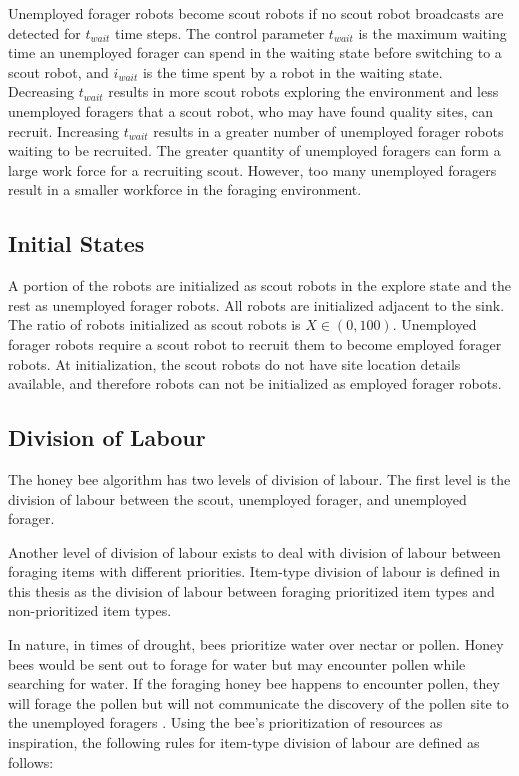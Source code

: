 Unemployed forager robots become scout robots if no scout robot broadcasts are detected for $t_{wait}$ time steps. The control parameter $t_{wait}$ is the maximum waiting time an unemployed forager can spend in the waiting state before switching to a scout robot, and $i_{wait}$ is the time spent by a robot in the waiting state. Decreasing $t_{wait}$ results in more scout robots exploring the environment and less unemployed foragers that a scout robot, who may have found quality sites, can recruit. Increasing $t_{wait}$ results in a greater number of unemployed forager robots waiting to be recruited. The greater quantity of unemployed foragers can form a large work force for a recruiting scout. However, too many unemployed foragers result in a smaller workforce in the foraging environment.

\subsection{Initial States}
\label{initialstates}

A portion of the robots are initialized as scout robots in the explore state and the rest as unemployed forager robots. All robots are initialized adjacent to the sink. The ratio of robots initialized as scout robots is $X\in(0,100)$. Unemployed forager robots require a scout robot to recruit them to become employed forager robots. At initialization, the scout robots do not have site location details available, and therefore robots can not be initialized as employed forager robots. 

\subsection{Division of Labour}
\label{natureinspired:divisionoflabour}
The honey bee algorithm has two levels of division of labour. The first level is the division of labour between the scout, unemployed forager, and unemployed forager.

Another level of division of labour exists to deal with division of labour between foraging items with different priorities. Item-type division of labour is defined in this thesis as the division of labour between foraging prioritized item types and non-prioritized item types.

In nature, in times of drought, bees prioritize water over nectar or pollen. Honey bees would be sent out to forage for water but may encounter pollen while searching for water. If the foraging honey bee happens to encounter pollen, they will forage the pollen but will not communicate the discovery of the pollen site to the unemployed foragers \cite{seeley2009wisdom}. Using the bee's prioritization of resources as inspiration, the following rules for item-type division of labour are defined as follows:

